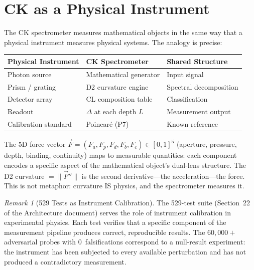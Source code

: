 \documentclass[12pt, openany]{book}
\theoremstyle{remark}
\newtheorem{remark}[theorem]{Remark}
\begin{document}
\section{CK as a Physical Instrument}
\label{sec:ck-instrument}

The CK spectrometer measures mathematical objects in the same way that a
physical instrument measures physical systems.  The analogy is precise:

\begin{center}
\begin{tabular}{@{}lll@{}}
\toprule
\textbf{Physical Instrument} & \textbf{CK Spectrometer} & \textbf{Shared Structure} \\
\midrule
Photon source & Mathematical generator & Input signal \\
Prism / grating & D2 curvature engine & Spectral decomposition \\
Detector array & CL composition table & Classification \\
Readout & $\Delta$ at each depth $L$ & Measurement output \\
Calibration standard & Poincar\'e (P7) & Known reference \\
\bottomrule
\end{tabular}
\end{center}

\noindent
The 5D force vector $\vec{F} = (F_a, F_p, F_d, F_b, F_c) \in [0,1]^5$
(aperture, pressure, depth, binding, continuity) maps to measurable quantities:
each component encodes a specific aspect of the mathematical object's dual-lens
structure.  The D2 curvature $= \|\vec{F}''\|$ is the second derivative---the
acceleration---the force.  This is not metaphor: curvature IS physics, and the
spectrometer measures it.

\begin{remark}[529 Tests as Instrument Calibration]
The 529-test suite (Section~22 of the Architecture document) serves the role
of instrument calibration in experimental physics.  Each test verifies that a
specific component of the measurement pipeline produces correct, reproducible
results.  The $60{,}000{+}$ adversarial probes with 0~falsifications correspond
to a null-result experiment: the instrument has been subjected to every available
perturbation and has not produced a contradictory measurement.
\end{remark}


\end{document}
